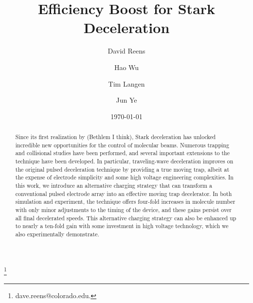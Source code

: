 \documentclass[%
 reprint,
 amsmath,amssymb,
 aps,
pra,
]{revtex4-1}
\begin{document}
\title{Efficiency Boost for Stark Deceleration}%

\author{David Reens}
\thanks{dave.reens@colorado.edu.}

\author{Hao Wu}

\author{Tim Langen}%

\author{Jun Ye}


\date{\today}


\begin{abstract}
Since its first realization by (Bethlem I think), Stark deceleration has unlocked incredible new opportunities for the control of molecular beams. 
Numerous trapping and collisional studies have been performed, and several important extensions to the technique have been developed. 
In particular, traveling-wave deceleration improves on the original pulsed deceleration technique by providing a true moving trap, albeit at the expense of electrode simplicity and some high voltage engineering complexities.
In this work, we introduce an alternative charging strategy that can transform a conventional pulsed electrode array into an effective moving trap decelerator.
In both simulation and experiment, the technique offers four-fold increases in molecule number with only minor adjustments to the timing of the device, and these gains persist over all final decelerated speeds.
This alternative charging strategy can also be enhanced up to nearly a ten-fold gain with some investment in high voltage technology, which we also experimentally demonstrate.
\end{abstract}


\maketitle


\end{document}
